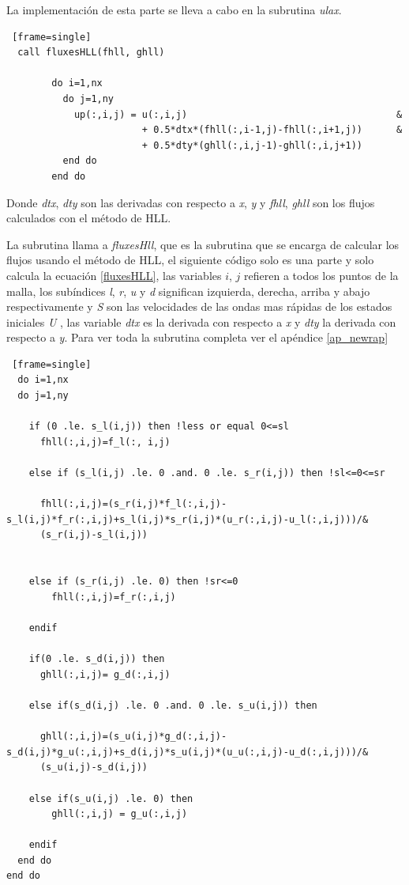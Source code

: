 \documentclass[12pt,a4paper]{book}
\begin{document}
La implementación de esta parte se lleva a cabo en la subrutina \emph{ulax}.

\begin{lstlisting} [frame=single]
  call fluxesHLL(fhll, ghll)
      
        do i=1,nx
          do j=1,ny
            up(:,i,j) = u(:,i,j)                                     &
                        + 0.5*dtx*(fhll(:,i-1,j)-fhll(:,i+1,j))      &
                        + 0.5*dty*(ghll(:,i,j-1)-ghll(:,i,j+1))
          end do
        end do

\end{lstlisting}

Donde \emph{dtx}, \emph{dty} son las derivadas con respecto a \emph{x}, \emph{y} y \emph{fhll}, \emph{ghll} son los flujos calculados con el método de HLL.

La subrutina llama a \emph{fluxesHll}, que es la subrutina que se encarga de calcular los flujos usando el método de HLL, el siguiente código solo es una parte
y solo calcula la ecuación \ref{fluxesHLL}, las variables $i$, $j$ refieren a todos los puntos de la malla, los subíndices \emph{l}, \emph{r}, \emph{u} y \emph{d}
significan izquierda, derecha, arriba y abajo respectivamente y \emph{S} son las velocidades de las ondas mas rápidas de los estados iniciales \emph{U} 
, las variable \emph{dtx} es la derivada con respecto a \emph{x} y \emph{dty} la derivada con respecto a \emph{y}. Para ver toda la subrutina completa ver el apéndice \ref{ap_newrap}

\begin{lstlisting} [frame=single]
  do i=1,nx
  do j=1,ny
    
    if (0 .le. s_l(i,j)) then !less or equal 0<=sl
      fhll(:,i,j)=f_l(:, i,j)

    else if (s_l(i,j) .le. 0 .and. 0 .le. s_r(i,j)) then !sl<=0<=sr
  
      fhll(:,i,j)=(s_r(i,j)*f_l(:,i,j)-s_l(i,j)*f_r(:,i,j)+s_l(i,j)*s_r(i,j)*(u_r(:,i,j)-u_l(:,i,j)))/&
      (s_r(i,j)-s_l(i,j))


    else if (s_r(i,j) .le. 0) then !sr<=0
        fhll(:,i,j)=f_r(:,i,j)

    endif

    if(0 .le. s_d(i,j)) then
      ghll(:,i,j)= g_d(:,i,j)

    else if(s_d(i,j) .le. 0 .and. 0 .le. s_u(i,j)) then

      ghll(:,i,j)=(s_u(i,j)*g_d(:,i,j)-s_d(i,j)*g_u(:,i,j)+s_d(i,j)*s_u(i,j)*(u_u(:,i,j)-u_d(:,i,j)))/&
      (s_u(i,j)-s_d(i,j))

    else if(s_u(i,j) .le. 0) then
        ghll(:,i,j) = g_u(:,i,j)

    endif
  end do
end do
\end{lstlisting}
\end{document}
